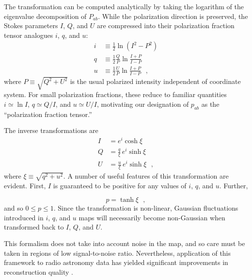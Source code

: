 \documentclass[twocolumn]{aastex631}
\begin{document}
The transformation can be computed analytically by taking the logarithm of the eigenvalue decomposition of $P_{ab}$. While the polarization direction is preserved, the Stokes parameters $I$, $Q$, and $U$ are compressed into their polarization fraction tensor analogues $i$, $q$, and $u$:
\begin{align}\label{eq:real2pt}
    i &\equiv \frac{1}{2} \ln (I^2 - P^2)\nonumber  \\
    q &\equiv  \frac{1}{2}\frac{Q}{P} \ln \frac{I+P}{I-P} \\
    u &\equiv  \frac{1}{2}\frac{U}{P} \ln \frac{I+P}{I-P}\nonumber 
    ~~~,
\end{align}
where $P \equiv \sqrt{Q^2 + U^2}$ is the usual polarized intensity independent of coordinate system. For small polarization fractions, these reduce to familiar quantities $i\simeq\ln I$, $q\simeq Q/I$, and $u\simeq U/I$, motivating our designation of $p_{ab}$ as the ``polarization fraction tensor.''

The inverse transformations are
\begin{align}\label{eq:pt2real}
    I &= e^i \cosh \xi \nonumber \\
    Q &= \frac{q}{\xi}\,e^i\sinh \xi  \\
    U &= \frac{u}{\xi}\,e^i\sinh \xi \nonumber
    ~~~,
\end{align}
where $\xi \equiv \sqrt{q^2 + u^2}$. A number of useful features of this transformation are evident. First, $I$ is guaranteed to be positive for any values of $i$, $q$, and $u$. Further,

\begin{equation}
    p = \tanh\xi
    ~~~,
\end{equation}
and so $0 \leq p \leq 1$. Since the transformation is non-linear, Gaussian fluctuations introduced in $i$, $q$, and $u$ maps will necessarily become non-Gaussian when transformed back to $I$, $Q$, and $U$.

This formalism does not take into account noise in the map, and so care must be taken in regions of low signal-to-noise ratio. Nevertheless, application of this framework to radio astronomy data has yielded significant improvements in reconstruction quality \citep{Arras:2021}.
\end{document}
